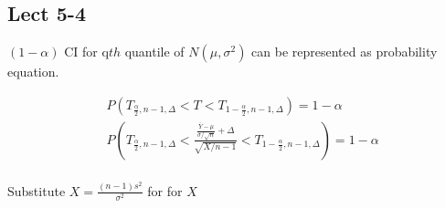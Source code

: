\documentclass[11pt,letterpaper]{article}
\begin{document}
\subsection*{Lect 5-4}
$(1-\alpha)$ CI for q$th$ quantile of $N(\mu, \sigma^2)$ can be represented as probability equation.

\begin{align*}
& P(T_{\frac{\alpha}{2}, n-1, \Delta} < T < T_{1-\frac{\alpha}{2}, n-1, \Delta}) = 1- \alpha \\
& P(T_{\frac{\alpha}{2}, n-1, \Delta} < \frac{\frac{\bar{Y} - \mu }{\sigma / \sqrt{n}} + \Delta}{\sqrt{X / n-1}} < T_{1-\frac{\alpha}{2}, n-1, \Delta}) = 1- \alpha \\
\end{align*}

\noindent Substitute $X = \frac{(n-1) s^2}{\sigma^2}$ for for $X$
\end{document}
